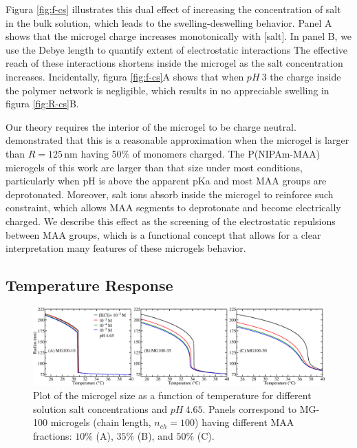 Figura \ref{fig:f-cs} illustrates this dual effect of increasing the concentration of salt in the bulk solution, which leads to the swelling-deswelling behavior.
Panel A shows that the microgel charge increases monotonically with [salt].
In panel B, we use the Debye length to quantify extent of electrostatic interactions %
The effective reach of these interactions shortens inside the microgel as the salt concentration increases.
Incidentally, figura \ref{fig:f-cs}A shows that when $pH~3$ the charge inside the polymer network is negligible, which results in no appreciable swelling in figura \ref{fig:R-cs}B.



Our theory requires the interior of the microgel to be charge neutral.
 demonstrated that this is a reasonable approximation when the microgel is larger than $R=125\,\text{nm}$ having 50\% of monomers charged.
The P(NIPAm-MAA) microgels of this work are larger than that size under most conditions, particularly when pH is above the apparent pKa and most MAA groups are deprotonated. 
Moreover, salt ions absorb inside the microgel to reinforce such constraint, which allows MAA segments to deprotonate and become electrically charged.
We describe this effect as the screening of the electrostatic repulsions between MAA groups, which is a functional concept that allows for a clear interpretation many features of these microgels behavior. %

\subsection{Temperature Response}\label{sec:temperature}

\begin{figure}[!htb]
	\centering
	\includegraphics[width=1\linewidth]{Figures/graph-gel/R-T.png}
	\caption{Plot of the microgel size as a function of temperature for different solution salt concentrations and $pH~4.65$.
		Panels correspond to MG-100 microgels (chain length, $n_{ch}=100$) having different MAA fractions: $10\%$ (A), $35\%$ (B), and $50\%$ (C).}
	\label{fig:R-T}
\end{figure}




